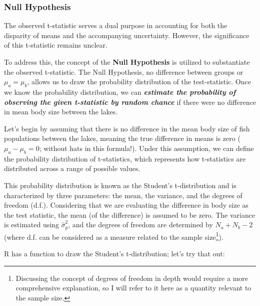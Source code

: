 \documentclass[
]{article}
\begin{document}
\hypertarget{null-hypothesis}{%
\subsubsection{Null Hypothesis}\label{null-hypothesis}}

The observed t-statistic serves a dual purpose in accounting for both the disparity of means and the accompanying uncertainty. However, the significance of this t-statistic remains unclear.

To address this, the concept of the \textbf{Null Hypothesis} is utilized to substantiate the observed t-statistic. The Null Hypothesis, no difference between groups or \(\mu_a = \mu_b\), allows us to draw the probability distribution of the test-statistic. Once we know the probability distribution, we can \textbf{\emph{estimate the probability of observing the given t-statistic by random chance}} if there were no difference in mean body size between the lakes.

Let's begin by assuming that there is no difference in the mean body size of fish populations between the lakes, meaning the true difference in means is zero (\(\mu_a - \mu_b = 0\); without hats in this formula!). Under this assumption, we can define the probability distribution of t-statistics, which represents how t-statistics are distributed across a range of possible values.

This probability distribution is known as the Student's t-distribution and is characterized by three parameters: the mean, the variance, and the degrees of freedom (d.f.). Considering that we are evaluating the difference in body size as the test statistic, the mean (of the difference) is assumed to be zero. The variance is estimated using \(\hat{\sigma}^2_p\), and the degrees of freedom are determined by \(N_a + N_b - 2\) (where d.f. can be considered as a measure related to the sample size\footnote{Discussing the concept of degrees of freedom in depth would require a more comprehensive explanation, so I will refer to it here as a quantity relevant to the sample size.}).

R has a function to draw the Student's t-distribution; let's try that out:
\end{document}
